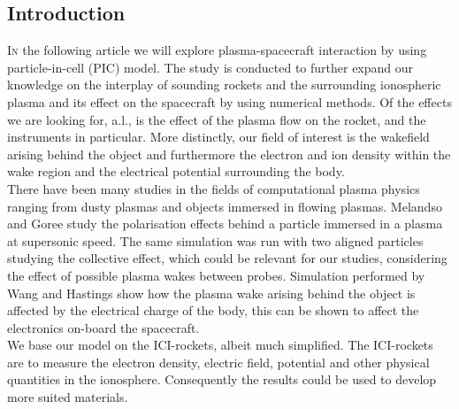 \documentclass[twoside]{article}
\begin{document}
\begin{multicols}{2} %

\section{Introduction}

\lettrine[nindent=0em,lines=2]{I}n the following article we will explore plasma-spacecraft interaction by using particle-in-cell (PIC) model.
The study is conducted to further expand our knowledge on the interplay of sounding rockets and the surrounding ionospheric plasma and its effect on the spacecraft by using numerical methods. Of the effects we are looking for, a.l., is the effect of the plasma flow on the rocket, and the instruments in particular. More distinctly, our field of interest is the wakefield arising behind the object and furthermore the electron and ion density within the wake region and the electrical potential surrounding the body. \\
\indent There have been many studies in the fields of computational plasma physics ranging from dusty plasmas and objects immersed in flowing plasmas. Melandso and Goree \cite{melandso} study the polarisation effects behind a particle immersed in a plasma at supersonic speed. The same simulation was run with two aligned particles studying the collective effect, which could be relevant for our studies, considering the effect of possible plasma wakes between probes. Simulation performed by Wang and Hastings \cite{wang} show how the plasma wake arising behind the object is affected by the electrical charge of the body, this can be shown to affect the electronics on-board the spacecraft. \\
\indent We base our model on the ICI-rockets, albeit much simplified. The ICI-rockets are to measure the electron density, electric field, potential and other physical quantities in the ionosphere. Consequently the results could be used to develop more suited materials.



\end{multicols}
\end{document}

